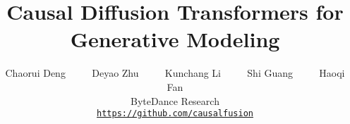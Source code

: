 \documentclass[10pt,twocolumn,letterpaper]{article}
\title{Causal Diffusion Transformers for Generative Modeling}
\author{Chaorui Deng ~~~~ Deyao Zhu ~~~~ Kunchang Li ~~~~ Shi Guang ~~~~ Haoqi Fan\\
ByteDance Research\\
\tt\small{\href{https://github.com/causalfusion/causalfusion.git}{https://github.com/causalfusion}} \\
}
\begin{document}
\maketitle







\clearpage
{
    \small
    
    
}

% 
\end{document}
